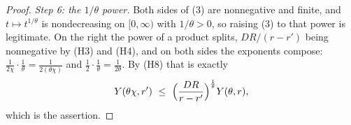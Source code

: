 \begin{proof}
\emph{Step 6: the $1/\theta$ power.}  Both sides of (3) are nonnegative and
finite, and $t\mapsto t^{1/\theta}$ is nondecreasing on $[0,\infty)$ with
$1/\theta>0$, so raising (3) to that power is legitimate.  On the right the
power of a product splits, $DR/(r-r')$ being nonnegative by (H3) and (H4), and
on both sides the exponents compose:
$\frac1{2\chi}\cdot\frac1\theta=\frac1{2(\theta\chi)}$ and
$\frac12\cdot\frac1\theta=\frac1{2\theta}$.  By (H8) that is exactly
\[
Y(\theta\chi,r')\ \le\ \Bigl(\frac{DR}{r-r'}\Bigr)^{\frac1\theta}Y(\theta,r),
\]
which is the assertion.
\end{proof}
